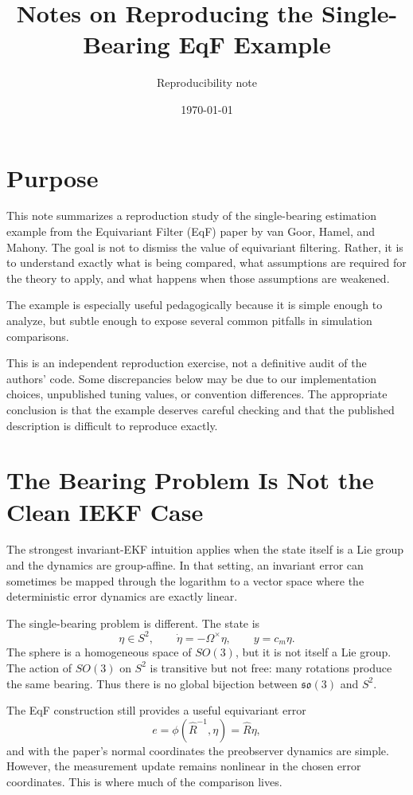 \documentclass[11pt]{article}
\title{Notes on Reproducing the Single-Bearing EqF Example}
\author{Reproducibility note}
\date{\today}
\begin{document}
\maketitle

\section{Purpose}

This note summarizes a reproduction study of the single-bearing estimation
example from the Equivariant Filter (EqF) paper by van Goor, Hamel, and
Mahony.  The goal is not to dismiss the value of equivariant filtering.
Rather, it is to understand exactly what is being compared, what assumptions
are required for the theory to apply, and what happens when those assumptions
are weakened.

The example is especially useful pedagogically because it is simple enough to
analyze, but subtle enough to expose several common pitfalls in simulation
comparisons.

This is an independent reproduction exercise, not a definitive audit of the
authors' code.  Some discrepancies below may be due to our
implementation choices, unpublished tuning values, or convention differences.
The appropriate conclusion is that the example deserves careful checking and
that the published description is difficult to reproduce exactly.

\section{The Bearing Problem Is Not the Clean IEKF Case}

The strongest invariant-EKF intuition applies when the state itself is a Lie
group and the dynamics are group-affine.  In that setting, an invariant error
can sometimes be mapped through the logarithm to a vector space where the
deterministic error dynamics are exactly linear.

The single-bearing problem is different.  The state is
\[
    \eta \in S^2, \qquad \dot{\eta} = -\Omega^\times \eta,
    \qquad y = c_m \eta .
\]
The sphere is a homogeneous space of \(SO(3)\), but it is not itself a Lie
group.  The action of \(SO(3)\) on \(S^2\) is transitive but not free: many
rotations produce the same bearing.  Thus there is no global bijection
between \(\mathfrak{so}(3)\) and \(S^2\).

The EqF construction still provides a useful equivariant error
\[
    e = \phi(\hat R^{-1},\eta) = \hat R \eta,
\]
and with the paper's normal coordinates the preobserver dynamics are simple.
However, the measurement update remains nonlinear in the chosen error
coordinates.  This is where much of the comparison lives.
\end{document}
